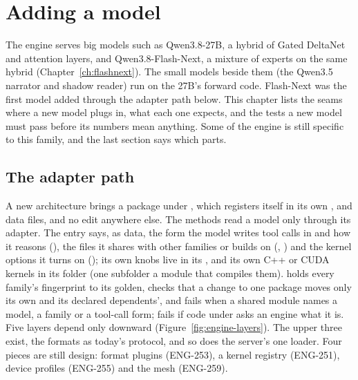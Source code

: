 \chapter{Adding a model}\label{ch:adding-model}

The engine serves big models such as Qwen3.8-27B, a hybrid of Gated DeltaNet and attention layers, and Qwen3.8-Flash-Next, a mixture of experts on the same hybrid (Chapter~\ref{ch:flashnext}). The small models beside them (the Qwen3.5 narrator and shadow reader) run on the 27B's forward code. Flash-Next was the first model added through the adapter path below. This chapter lists the seams where a new model plugs in, what each one expects, and the tests a new model must pass before its numbers mean anything. Some of the engine is still specific to this family, and the last section says which parts.

\section{The adapter path}\label{sec:adapter-path}

A new architecture brings a package under , which registers itself in its own , and data files, and no edit anywhere else. The methods read a model only through its adapter. The entry says, as data, the form the model writes tool calls in and how it reasons (), the files it shares with other families or builds on (, ) and the kernel options it turns on (); its own knobs live in its , and its own C++ or CUDA kernels in its  folder (one subfolder a module that compiles them).  holds every family's fingerprint to its golden, checks that a change to one package moves only its own and its declared dependents', and fails when a shared module names a model, a family or a tool-call form;  fails if code under  asks an engine what it is. Five layers depend only downward (Figure~\ref{fig:engine-layers}). The upper three exist, the formats as today's  protocol, and so does the server's one loader. Four pieces are still design: format plugins (ENG-253), a kernel registry (ENG-251), device profiles (ENG-255) and the mesh (ENG-259).


